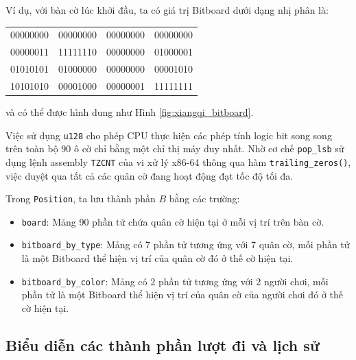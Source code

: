 Ví dụ, với bàn cờ lúc khởi đầu, ta có giá trị Bitboard dưới dạng nhị phân là:

\begin{center}
\begin{tabular}{llll}
  00000000 & 00000000 & 00000000 & 00000000 \\
  00000011 & 11111110 & 00000000 & 01000001 \\
  01010101 & 01000000 & 00000000 & 00001010 \\ 
  10101010 & 00001000 & 00000001 & 11111111 
\end{tabular}
\end{center}

và có thể được hình dung như Hình \ref{fig:xiangqi_bitboard}.

Việc sử dụng \texttt{u128} cho phép CPU thực hiện các phép tính logic bit song song trên toàn bộ 90 ô cờ chỉ bằng một chỉ thị máy duy nhất. Nhờ cơ chế \texttt{pop\_lsb} sử dụng lệnh assembly \texttt{TZCNT} của vi xử lý x86-64 thông qua hàm \texttt{trailing\_zeros()}, việc duyệt qua tất cả các quân cờ đang hoạt động đạt tốc độ tối đa.

Trong \texttt{Position}, ta lưu thành phần $B$ bằng các trường:

\begin{itemize}
  \item \texttt{board}: Mảng 90 phần tử chứa quân cờ hiện tại ở mỗi vị trí trên bàn cờ.
  \item \texttt{bitboard\_by\_type}: Mảng có 7 phần tử tương ứng với 7 quân cờ, mỗi phần tử là một Bitboard thể hiện vị trí của quân cờ đó ở thế cờ hiện tại.
  \item \texttt{bitboard\_by\_color}: Mảng có 2 phần tử tương ứng với 2 người chơi, mỗi phần tử là một Bitboard thể hiện vị trí của quân cờ của người chơi đó ở thế cờ hiện tại.
\end{itemize}

\subsection{Biểu diễn các thành phần lượt đi và lịch sử}

